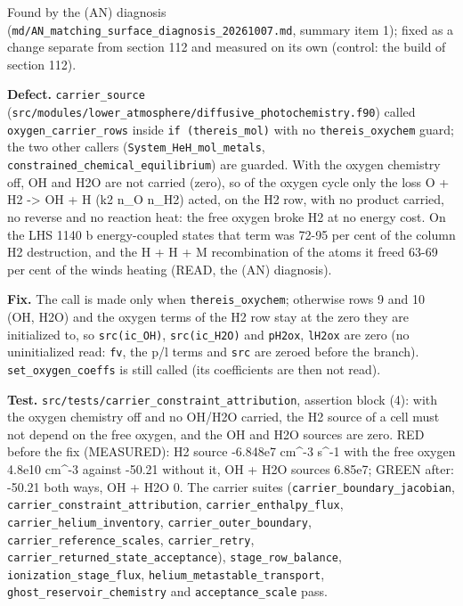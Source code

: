 \documentclass[english,a4paper]{my_memo}
\begin{document}
Found by the (AN) diagnosis (\texttt{md/AN\_matching\_surface\_diagnosis\_20261007.md},
summary item 1); fixed as a change separate from section 112 and measured on
its own (control: the build of section 112).

\textbf{Defect.} \texttt{carrier\_source} (\texttt{src/modules/lower\_atmosphere/diffusive\_photochemistry.f90})
called \texttt{oxygen\_carrier\_rows} inside \texttt{if\ (thereis\_mol)} with no
\texttt{thereis\_oxychem} guard; the two other callers (\texttt{System\_HeH\_mol\_metals},
\texttt{constrained\_chemical\_equilibrium}) are guarded. With the oxygen chemistry
off, OH and H2O are not carried (zero), so of the oxygen cycle only the loss
O + H2 -\textgreater{} OH + H (k2 n\_O n\_H2) acted, on the H2 row, with no product carried,
no reverse and no reaction heat: the free oxygen broke H2 at no energy cost.
On the LHS 1140 b energy-coupled states that term was 72-95 per cent of the
column H2 destruction, and the H + H + M recombination of the atoms it freed
63-69 per cent of the wind\textquotesingle s heating (READ, the (AN) diagnosis).

\textbf{Fix.} The call is made only when \texttt{thereis\_oxychem}; otherwise rows 9 and
10 (OH, H2O) and the oxygen terms of the H2 row stay at the zero they are
initialized to, so \texttt{src(ic\_OH)}, \texttt{src(ic\_H2O)} and \texttt{pH2ox}, \texttt{lH2ox} are zero
(no uninitialized read: \texttt{fv}, the p/l terms and \texttt{src} are zeroed before the
branch). \texttt{set\_oxygen\_coeffs} is still called (its coefficients are then not
read).

\textbf{Test.} \texttt{src/tests/carrier\_constraint\_attribution}, assertion block (4):
with the oxygen chemistry off and no OH/H2O carried, the H2 source of a cell
must not depend on the free oxygen, and the OH and H2O sources are zero.
RED before the fix (MEASURED): H2 source -6.848e7 cm\^{}-3 s\^{}-1 with the free
oxygen 4.8e10 cm\^{}-3 against -50.21 without it, OH + H2O sources 6.85e7;
GREEN after: -50.21 both ways, OH + H2O 0. The carrier suites
(\texttt{carrier\_boundary\_jacobian}, \texttt{carrier\_constraint\_attribution},
\texttt{carrier\_enthalpy\_flux}, \texttt{carrier\_helium\_inventory}, \texttt{carrier\_outer\_boundary},
\texttt{carrier\_reference\_scales}, \texttt{carrier\_retry},
\texttt{carrier\_returned\_state\_acceptance}), \texttt{stage\_row\_balance},
\texttt{ionization\_stage\_flux}, \texttt{helium\_metastable\_transport},
\texttt{ghost\_reservoir\_chemistry} and \texttt{acceptance\_scale} pass.
\end{document}
